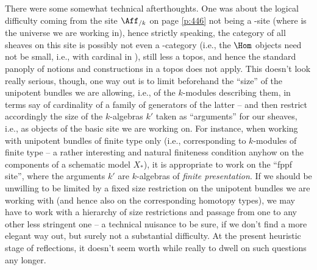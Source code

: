There were some somewhat technical afterthoughts. One was about the
logical difficulty coming from the site $\Aff_{/k}$ on page
\ref{p:446} not being a \scrU-site (where \scrU{} is the universe we
are working in), hence strictly speaking, the category of all sheaves
on this site is possibly not even a \scrU-category (i.e., the $\Hom$
objects need not be small, i.e., with cardinal in \scrU), still less a
topos, and hence the standard panoply of notions and constructions in
a topos does not apply. This doesn't look really serious, though, one
way out is to limit beforehand the ``size'' of the unipotent bundles
we are allowing, i.e., of the $k$-modules describing them, in terms
say of cardinality of a family of generators of the latter -- and then
restrict accordingly the size of the $k$-algebras $k'$ taken as
``arguments'' for our sheaves, i.e., as objects of the basic site we
are working on. For instance, when working with unipotent bundles of
finite type only (i.e., corresponding to $k$-modules of finite type --
a rather interesting and natural finiteness condition anyhow on the
components of a schematic model $X_*$), it is appropriate to work on
the ``fppf site'', where the arguments $k'$ are $k$-algebras of \emph{finite
  presentation}. If we should be unwilling to be limited by a fixed
size restriction on the unipotent bundles we are working with (and
hence also on the corresponding homotopy types), we may have to work
with a hierarchy of size restrictions and passage from one to any
other less stringent one -- a technical nuisance to be sure, if we
don't find a more elegant way out, but surely not a substantial
difficulty. At the present heuristic stage of reflections, it doesn't
seem worth while really to dwell on such questions any longer.

